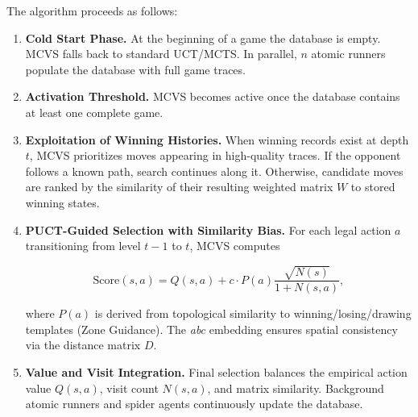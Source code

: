 \documentclass[11pt,a4paper]{article}
\theoremstyle{plain}
\theoremstyle{definition}
\begin{document}
\vspace{0.5em}

The algorithm proceeds as follows:

\vspace{0.5em}

\begin{enumerate}
\item \textbf{Cold Start Phase.} 
At the beginning of a game the database is empty. MCVS falls back to standard UCT/MCTS. In parallel, $n$ atomic runners populate the database with full game traces.

\vspace{0.5em}

\item \textbf{Activation Threshold.} 
MCVS becomes active once the database contains at least one complete game.

\vspace{0.5em}

\item \textbf{Exploitation of Winning Histories.} 
When winning records exist at depth $t$, MCVS prioritizes moves appearing in high-quality traces. If the opponent follows a known path, search continues along it. Otherwise, candidate moves are ranked by the similarity of their resulting weighted matrix $W$ to stored winning states.

\vspace{0.5em}

\item \textbf{PUCT-Guided Selection with Similarity Bias.} 
For each legal action $a$ transitioning from level $t-1$ to $t$, MCVS computes

\vspace{0.5em}

\[
\text{Score}(s,a) = Q(s,a) + c \cdot P(a) \frac{\sqrt{N(s)}}{1+N(s,a)},
\]

\vspace{0.5em}

where $P(a)$ is derived from topological similarity to winning/losing/drawing templates (Zone Guidance). The \emph{abc} embedding ensures spatial consistency via the distance matrix $D$.

\vspace{0.5em}

\item \textbf{Value and Visit Integration.} 
Final selection balances the empirical action value $Q(s,a)$, visit count $N(s,a)$, and matrix similarity. Background atomic runners and spider agents continuously update the database.
\end{enumerate}
\end{document}
